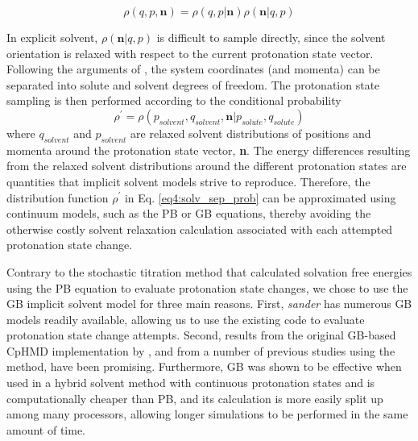 \begin{equation}
   \rho(q, p, \textbf{n}) = \rho(q, p | \textbf{n}) \rho(\textbf{n} | q, p)
   \label{eq4:conditional_probability}
\end{equation}

In explicit solvent, $\rho(\textbf{n} | q, p)$ is difficult to sample directly,
since the solvent orientation is relaxed with respect to the current protonation
state vector. Following the arguments of
\citeauthor{Baptista_JChemPhys_2002_v117_p4184}, the system coordinates (and
momenta) can be separated into solute and solvent degrees of freedom. 
\cite{Baptista_JChemPhys_2002_v117_p4184} The protonation state sampling is then
performed according to the conditional probability
\begin{equation}
   \rho^\prime = \rho(p_{solvent}, q_{solvent}, \textbf{n} | p_{solute},
         q_{solute})
   \label{eq4:solv_sep_prob}
\end{equation}
where $q_{solvent}$ and $p_{solvent}$ are relaxed solvent
distributions of positions and momenta around the protonation state vector,
\textbf{n}. \cite{Baptista_JChemPhys_2002_v117_p4184} The energy differences
resulting from the relaxed solvent distributions around the different
protonation states are quantities that implicit solvent models strive to
reproduce. Therefore, the distribution function $\rho^\prime$ in Eq.
\ref{eq4:solv_sep_prob} can be approximated using continuum models, such as the
PB or GB equations, thereby avoiding the otherwise costly solvent relaxation
calculation associated with each attempted protonation state change.

Contrary to the stochastic titration method that calculated solvation free
energies using the PB equation to evaluate protonation state changes,
\cite{Baptista_JChemPhys_2002_v117_p4184} we chose to use the GB implicit
solvent model for three main reasons. First, \emph{sander} has numerous GB
models readily available, \cite{Hawkins_ChemPhysLett_1995_v246_p122,
Hawkins_JPhysChem_1996_v100_p19824, Onufriev_Proteins_2004_v55_p383,
Mongan_JChemTheoryComput_2007_v3_p156, Shang_JMolGraphics_2011_v29_p676}
allowing us to use the existing code to evaluate protonation state change
attempts.  Second, results from the original GB-based CpHMD implementation by
\citeauthor{Mongan_JComputChem_2004_v25_p2038}, and from a number of
previous studies using the method, have been promising.
\cite{Mongan_JComputChem_2004_v25_p2038, Frantz_JCellBiol_2008_v183_p865,
Williams_JChemTheoryComput_2010_v6_p560, Swails_JChemTheoryComput_2012_v8_p4393}
Furthermore, GB was shown to be effective when used in a hybrid solvent method
with continuous protonation states
\cite{Wallace_JChemTheoryComput_2011_v7_p2617} and is computationally cheaper
than PB, and its calculation is more easily split up among many processors,
allowing longer simulations to be performed in the same amount of time.


